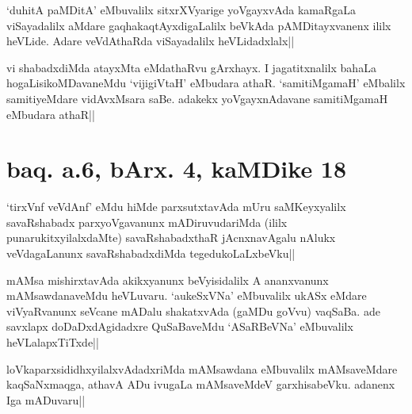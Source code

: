 
\begin{artha}
`duhitA paMDitA' eMbuvalilx sitxrXVyarige yoVgayxvAda kamaRgaLa 
viSayadalilx aMdare gaqhakaqtAyxdigaLalilx beVkAda pAMDitayxvanenx 
ililx heVLide. Adare veVdAthaRda viSayadalilx heVLidadxlalx||
\end{artha}


\begin{artha}
vi shabadxdiMda atayxMta eMdathaRvu gArxhayx. I jagatitxnalilx bahaLa 
hogaLisikoMDavaneMdu `vijigiVtaH' eMbudara athaR. `samitiMgamaH' 
eMbalilx samitiyeMdare vidAvxMsara saBe. adakekx yoVgayxnAdavane 
samitiMgamaH eMbudara athaR||
\end{artha}

\section*{baq. a.6, bArx. 4, kaMDike 18}

\stext


\begin{artha}
`tirxVnf veVdAnf' eMdu hiMde parxsutxtavAda mUru saMKeyxyalilx 
savaRshabadx parxyoVgavanunx mADiruvudariMda (ililx 
punarukitxyilalxdaMte) savaRshabadxthaR jAcnxnavAgalu nAlukx 
veVdagaLanunx savaRshabadxdiMda tegedukoLaLxbeVku||
\end{artha}


\begin{artha}
mAMsa mishirxtavAda akikxyanunx beVyisidalilx A ananxvanunx 
mAMsawdanaveMdu heVLuvaru. `aukeSxVNa' eMbuvalilx ukASx eMdare 
viVyaRvanunx seVcane mADalu shakatxvAda (gaMDu goVvu) vaqSaBa. ade 
savxlapx doDaDxdAgidadxre QuSaBaveMdu `ASaRBeVNa' eMbuvalilx 
heVLalapxTiTxde||
\end{artha}


\begin{artha}
loVkaparxsididhxyilalxvAdadxriMda mAMsawdana eMbuvalilx mAMsaveMdare 
kaqSaNxmaqga, athavA ADu ivugaLa mAMsaveMdeV garxhisabeVku. adanenx 
Iga mADuvaru||
\end{artha}

